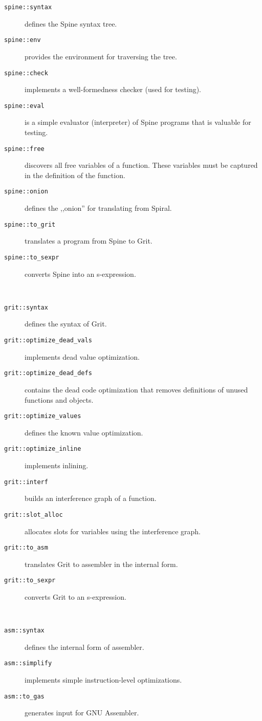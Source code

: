 \begin{description}
  \item[\texttt{spine::syntax}] defines the Spine syntax tree.
  \item[\texttt{spine::env}] provides the environment for traversing the tree.
  \item[\texttt{spine::check}] implements a well-formedness checker (used for
    testing).
  \item[\texttt{spine::eval}] is a simple evaluator (interpreter) of Spine
    programs that is valuable for testing.
  \item[\texttt{spine::free}] discovers all free variables of a function. These
    variables must be captured in the definition of the function.
  \item[\texttt{spine::onion}] defines the ,,onion'' for translating from
    Spiral.
  \item[\texttt{spine::to_grit}] translates a program from Spine to Grit.
  \item[\texttt{spine::to_sexpr}] converts Spine into an s-expression.
\end{description}
~
\begin{description}
  \item[\texttt{grit::syntax}] defines the syntax of Grit.
  \item[\texttt{grit::optimize_dead_vals}] implements dead value optimization.
  \item[\texttt{grit::optimize_dead_defs}] contains the dead code optimization
    that removes definitions of unused functions and objects.
  \item[\texttt{grit::optimize_values}] defines the known value optimization.
  \item[\texttt{grit::optimize_inline}] implements inlining.
  \item[\texttt{grit::interf}] builds an interference graph of a function.
  \item[\texttt{grit::slot_alloc}] allocates slots for variables using the
    interference graph.
  \item[\texttt{grit::to_asm}] translates Grit to assembler in the internal
    form.
  \item[\texttt{grit::to_sexpr}] converts Grit to an s-expression.
\end{description}
~
\begin{description}
  \item[\texttt{asm::syntax}] defines the internal form of assembler.
  \item[\texttt{asm::simplify}] implements simple instruction-level
    optimizations.
  \item[\texttt{asm::to_gas}] generates input for GNU Assembler.
\end{description}

